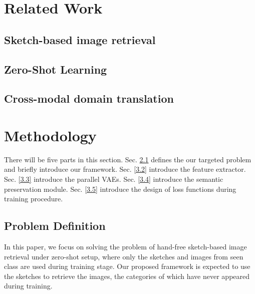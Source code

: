 \documentclass[10pt,twocolumn,letterpaper]{article}
\begin{document}

\section{Related Work}

\subsection{Sketch-based image retrieval}

\subsection{Zero-Shot Learning}

\subsection{Cross-modal domain translation}

\section{Methodology}
There will be five parts in this section. 
Sec. \ref{3.1} defines the our targeted problem and briefly introduce our framework. 
Sec. \ref{3.2} introduce the feature extractor. 
Sec. \ref{3.3} introduce the parallel VAEs. 
Sec. \ref{3.4} introduce the semantic preservation module. 
Sec. \ref{3.5} introduce the design of loss functions during training procedure.

\subsection{Problem Definition} \label{3.1}
In this paper, we focus on solving the problem of hand-free sketch-based image retrieval under zero-shot setup, where only the sketches and images from seen class are used during training stage. 
Our proposed framework is expected to use the sketches to retrieve the images, the categories of which have never appeared during training.
\end{document}
